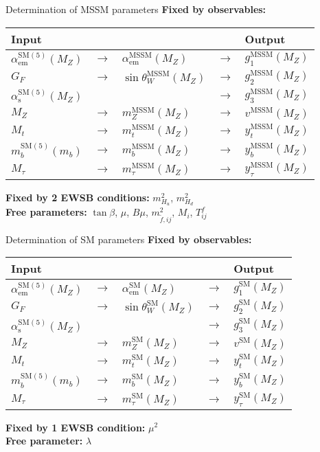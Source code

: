 \documentclass[hyperref={pdfpagelabels=false},ngerman]{beamer}
\renewcommand{\emph}{\textbf}
\newcommand{\SM}{\ensuremath{\text{SM}}}
\newcommand{\MSSM}{\ensuremath{\text{MSSM}}}
\begin{document}
\begin{frame}[noframenumbering]{Determination of MSSM parameters}
  \emph{Fixed by observables:}
  \begin{table}
    \centering
    \begin{tabular}{lllll}
      Input & & & & Output \\
      \midrule
      $\alpha_\text{em}^{\SM(5)}(M_Z)$ & $\rightarrow$ & $\alpha_\text{em}^\MSSM(M_Z)$ & $\rightarrow$ & $g_1^\MSSM(M_Z)$ \\
      $G_F$ & $\rightarrow$ & $\sin\theta_W^\MSSM(M_Z)$ & $\rightarrow$ & $g_2^\MSSM(M_Z)$ \\
      $\alpha_\text{s}^{\SM(5)}(M_Z)$ & & & $\rightarrow$ & $g_3^\MSSM(M_Z)$ \\
      $M_Z$ & $\rightarrow$ & $m_Z^\MSSM(M_Z)$ & $\rightarrow$ & $v^\MSSM(M_Z)$ \\
      $M_t$ & $\rightarrow$ & $m_t^\MSSM(M_Z)$ & $\rightarrow$ & $y_t^\MSSM(M_Z)$ \\
      $m_b^{\SM(5)}(m_b)$ & $\rightarrow$ & $m_b^\MSSM(M_Z)$ & $\rightarrow$ & $y_b^\MSSM(M_Z)$ \\
      $M_\tau$ & $\rightarrow$ & $m_\tau^\MSSM(M_Z)$ & $\rightarrow$ & $y_\tau^\MSSM(M_Z)$ \\
    \end{tabular}
  \end{table}
  \emph{Fixed by 2 EWSB conditions:} $m^2_{H_u}$, $m^2_{H_d}$ \\[1em]
  \emph{Free parameters:} $\tan\beta$, $\mu$, $B\mu$, $m_{\tilde{f},ij}^2$, $M_i$,
  $T^f_{ij}$
\end{frame}

\begin{frame}[noframenumbering]{Determination of SM parameters}
  \emph{Fixed by observables:}
  \begin{table}
    \centering
    \begin{tabular}{lllll}
      Input & & & & Output \\
      \midrule
      $\alpha_\text{em}^{\SM(5)}(M_Z)$ & $\rightarrow$ & $\alpha_\text{em}^\SM(M_Z)$ & $\rightarrow$ & $g_1^\SM(M_Z)$ \\
      $G_F$ & $\rightarrow$ & $\sin\theta_W^\SM(M_Z)$ & $\rightarrow$ & $g_2^\SM(M_Z)$ \\
      $\alpha_\text{s}^{\SM(5)}(M_Z)$ & & & $\rightarrow$ & $g_3^\SM(M_Z)$ \\
      $M_Z$ & $\rightarrow$ & $m_Z^\SM(M_Z)$ & $\rightarrow$ & $v^\SM(M_Z)$ \\
      $M_t$ & $\rightarrow$ & $m_t^\SM(M_Z)$ & $\rightarrow$ & $y_t^\SM(M_Z)$ \\
      $m_b^{\SM(5)}(m_b)$ & $\rightarrow$ & $m_b^\SM(M_Z)$ & $\rightarrow$ & $y_b^\SM(M_Z)$ \\
      $M_\tau$ & $\rightarrow$ & $m_\tau^\SM(M_Z)$ & $\rightarrow$ & $y_\tau^\SM(M_Z)$ \\
    \end{tabular}
  \end{table}
  \emph{Fixed by 1 EWSB condition:} $\mu^2$ \\[1em]
  \emph{Free parameter:} $\lambda$
\end{frame}
\end{document}
